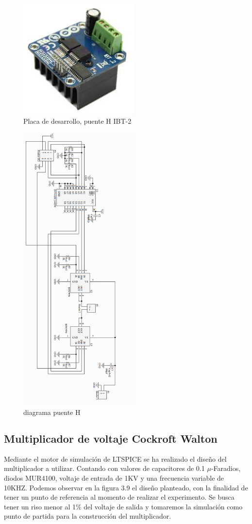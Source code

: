 \begin{figure}[H]
\centering
\includegraphics[width=6cm]{Capitulo3/figs/bts.jpg}
\caption{Placa de desarrollo, puente H IBT-2}
\end{figure}

\begin{figure}[H]
\centering
\includegraphics[width=6cm]{Capitulo3/figs/ibt2.png}
\caption{diagrama puente H}
\end{figure}



\newpage


\subsection{Multiplicador de voltaje Cockroft Walton}
Mediante el motor de simulación de LTSPICE se ha realizado el diseño del multiplicador a utilizar. Contando con valores de capacitores de 0.1 $\mu$-Faradios, diodos MUR4100, voltaje de entrada de 1KV y una frecuencia variable de 10KHZ. Podemos observar en la figura 3.9 el diseño planteado, con la finalidad de tener un punto de referencia al momento de realizar el experimento. Se busca tener un riso menor al 1\% del voltaje de salida y tomaremos la simulación como punto de partida para la construcción del multiplicador. \\

